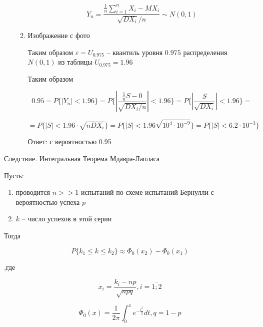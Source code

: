\begin{enumerate}
\begin{enumerate}
                \begin{equation*}
                    Y_n = \frac{\frac{1}{n} \sum_{i=1}^n X_i - MX_i}{\sqrt{DX_i}/ n } \sim N(0,1)
                \end{equation*}

            \item Изображение с фото

                Таким образом $\varepsilon = U_{0.975}$ -- квантиль уровня $0.975$ распределения $N(0,1)$ из таблицы $U_{0.975} = 1.96$

                Таким образом

                \begin{equation*}
                    0.95 = P\{|Y_n| < 1.96 \} = P\{ |\frac{\frac{1}{n} S - 0}{\sqrt{DX_i / n}} | < 1.96 \} = P\{ |\frac{S}{\sqrt{DX_i}}| < 1.96 \} =
                \end{equation*}

                \begin{equation*}
                    = P \{ |S| < 1.96 \cdot \sqrt{nDX_i} \} = P\{|S| < 1.96 \sqrt{10^4 \cdot 10^{-9}}\} = P\{ |S| <  6.2 \cdot 10^{-3}\}
                \end{equation*}

                Ответ: с вероятностью 0.95
        \end{enumerate}
\end{enumerate}

Следствие. Интегральная Теорема Мдавра-Лапласа

Пусть:

\begin{enumerate}
    \item проводится $n>>1$ испытаний по схеме испытаний Бернулли с вероятностью успеха $p$
    \item $k$ -- число успехов в этой серии
\end{enumerate}

Тогда

\begin{equation*}
    P\{k_1 \le k \le k_2 \} \approx \Phi_0(x_2) - \Phi_0(x_1)
\end{equation*}

,где

\begin{equation*}
    x_i = \frac{k_i - np}{\sqrt{npq}}, i = \overline{1;2}
\end{equation*}

\begin{equation*}
    \Phi_0 (x) = \frac{1}{2\pi} \int_0^x e^{-\frac{t^2}{2}}dt, q = 1-p
\end{equation*}

